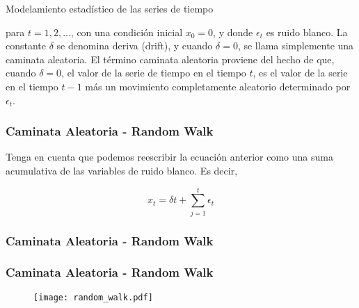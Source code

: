 \documentclass[xcolor=(list of options)]{beamer}
\begin{document}
\begin{section}{Modelamiento estad\'istico de las series de tiempo}
\begin{frame}
para $t = 1, 2,. . .$, con una condici\'on inicial $x_0 = 0$, y donde $\epsilon_t$ es ruido blanco. La constante $\delta$ se denomina deriva (drift), y cuando $\delta=0$, se llama simplemente una caminata aleatoria. El t\'ermino caminata aleatoria proviene del hecho de que, cuando $\delta=0$, el valor de la serie de tiempo en el tiempo $t$, es el valor de la serie en el tiempo $t - 1$ m\'as un movimiento completamente aleatorio determinado por $\epsilon_t$. 
\end{frame}

\begin{frame}
\frametitle{Caminata Aleatoria - Random Walk}

Tenga en cuenta que podemos reescribir la ecuaci\'on anterior como una suma acumulativa de las variables de ruido blanco. Es decir,

\begin{equation*}
x_t = \delta t + \sum_{j=1}^{t} \epsilon_t 
\end{equation*}

\end{frame}

\begin{frame}
\frametitle{Caminata Aleatoria - Random Walk}

\end{frame}
\begin{frame}
\frametitle{Caminata Aleatoria - Random Walk}

\begin{figure}[t!]
\texttt{[image: random\_walk.pdf]}
\end{figure}


\end{frame}
\end{section}
\end{document}
